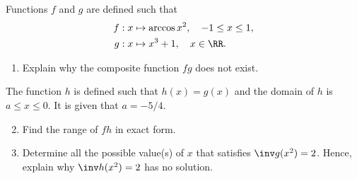 \begin{problem}[\chili]
    Functions $f$ and $g$ are defined such that    
    \begin{align*}
        f &: x \mapsto \arccos{x^2}, \quad -1 \leq x \leq 1,\\
        g &: x \mapsto x^3 + 1, \quad x \in \RR.
    \end{align*}

    \begin{enumerate}
        \item Explain why the composite function $fg$ does not exist.
    \end{enumerate}
    
    The function $h$ is defined such that $h(x) = g(x)$ and the domain of $h$ is $a \leq x \leq 0$. It is given that $a = -5/4$.

    \begin{enumerate}
        \setcounter{enumi}{1}
        \item Find the range of $fh$ in exact form.
        \item Determine all the possible value(s) of $x$ that satisfies $\inv g(x^2) = 2$. Hence, explain why $\inv h (x^2) = 2$ has no solution.
    \end{enumerate}
\end{problem}
